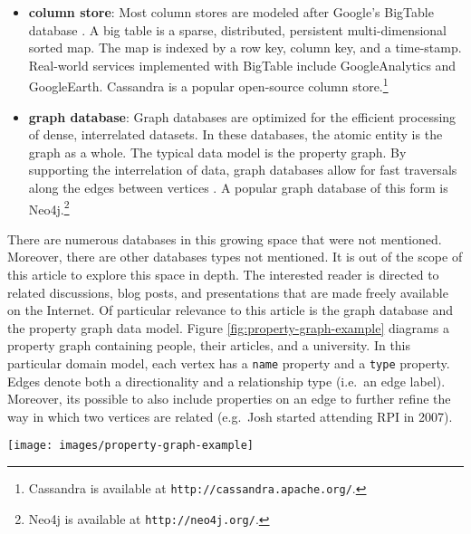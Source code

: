 \documentclass{svmult}
\newcommand{\ttt}{\texttt}
\begin{document}
\begin{itemize}
	\item \textbf{column store}: Most column stores are modeled after Google's BigTable database \cite{bigtable:chang2006}. A big table is a sparse, distributed, persistent multi-dimensional sorted map. The map is indexed by a row key, column key, and a time-stamp. Real-world services implemented with BigTable include GoogleAnalytics and GoogleEarth. Cassandra is a popular open-source column store.\footnote{Cassandra is available at \ttt{http://cassandra.apache.org/}.}
	\item \textbf{graph database}: Graph databases are optimized for the efficient processing of dense, interrelated datasets. In these databases, the atomic entity is the graph as a whole. The typical data model is the property graph. By supporting the interrelation of data, graph databases allow for fast traversals along the edges between vertices \cite{traversal:rodriguez2010}. A popular graph database of this form is Neo4j.\footnote{Neo4j is available at \ttt{http://neo4j.org/}.}
\end{itemize}

There are numerous databases in this growing space that were not mentioned. Moreover, there are other databases types not mentioned. It is out of the scope of this article to explore this space in depth. The interested reader is directed to related discussions, blog posts, and presentations that are made freely available on the Internet. Of particular relevance to this article is the graph database and the property graph data model. Figure \ref{fig:property-graph-example} diagrams a property graph containing people, their articles, and a university. In this particular domain model, each vertex has a \ttt{name} property and a \ttt{type} property. Edges denote both a directionality and a relationship type (i.e.~an edge label). Moreover, its possible to also include properties on an edge to further refine the way in which two vertices are related (e.g.~Josh started attending RPI in 2007).
\begin{figure*}[h!]
	\centering
		\texttt{[image: images/property-graph-example]}
	\caption{\label{fig:property-graph-example}A property graph is a directed, labeled, attributed, multi-graph. The edges are directed, vertices/edges are labeled, vertices/edges have associated key/value pair metadata (i.e.~properties), and there can be multiple edges between any two vertices.}
\end{figure*}
\end{document}
